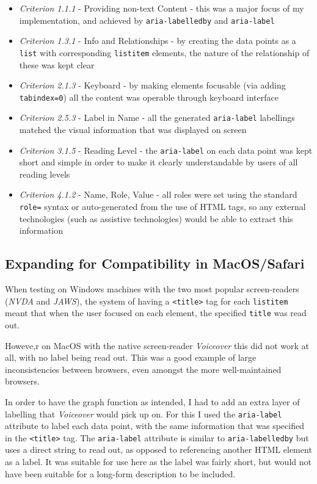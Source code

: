 \documentclass[ %
                    author={Aleena Baig},
                supervisor={Dr Simon Lock},
                    degree={BSc},
                     title={On Making Web Accessible Graphs},
                  subtitle={},
                      year={2019} ]{dissertation}
\begin{document}
\begin{itemize}
    \item \textit{Criterion 1.1.1} - Providing non-text Content - this was a major focus of my implementation, and achieved by \texttt{aria-labelledby} and \texttt{aria-label}
    \item \textit{Criterion 1.3.1} - Info and Relationships - by creating the data points as a \texttt{list} with corresponding \texttt{listitem} elements, the nature of the relationship of these was kept clear
    \item \textit{Criterion 2.1.3} - Keyboard - by making elements focusable (via adding \texttt{tabindex=0}) all the content was operable through keyboard interface
    \item \textit{Criterion 2.5.3} - Label in Name - all the generated \texttt{aria-label} labellings matched the visual information that was displayed on screen
    \item \textit{Criterion 3.1.5} - Reading Level - the \texttt{aria-label} on each data point was kept short and simple in order to make it clearly understandable by users of all reading levels
    \item \textit{Criterion 4.1.2} - Name, Role, Value - all roles were set using the standard \texttt{role=} syntax or auto-generated from the use of HTML tags, so any external technologies (such as assistive technologies) would be able to extract this information
\end{itemize}

\subsection{Expanding for Compatibility in MacOS/Safari}

When testing on Windows machines with the two most popular screen-readers (\textit{NVDA} and \textit{JAWS}), the system of having a \texttt{<title>} tag for each \texttt{listitem} meant that when the user focused on each element, the specified \texttt{title} was read out.

Howeve,r on MacOS with the native screen-reader \textit{Voiceover} this did not work at all, with no label being read out. This was a good example of large inconsistencies between browsers, even amongst the more well-maintained browsers.

In order to have the graph function as intended, I had to add an extra layer of labelling that \textit{Voiceover} would pick up on. For this I used the \texttt{aria-label} attribute to label each data point, with the same information that was specified in the \texttt{<title>} tag. The \texttt{aria-label} attribute is similar to \texttt{aria-labelledby} but uses a direct string to read out, as opposed to referencing another HTML element as a label. It was suitable for use here as the label was fairly short, but would not have been suitable for a long-form description to be included.
\end{document}
